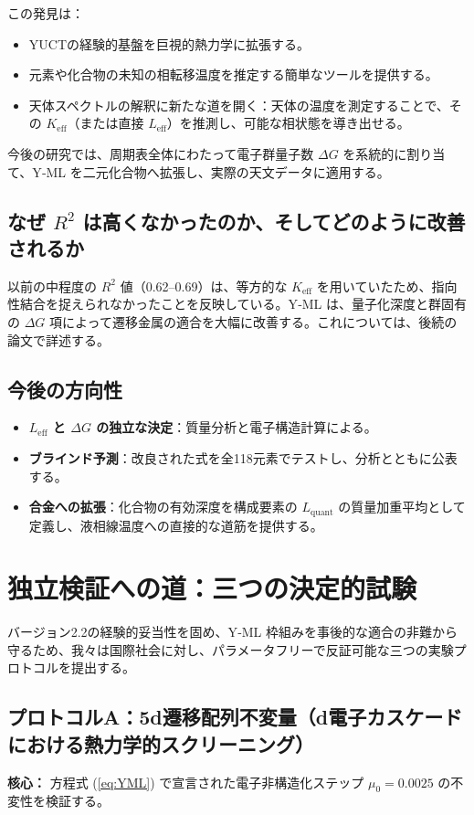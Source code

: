 \documentclass[11pt,a4paper]{article}
\newcommand{\Keff}{K_{\mathrm{eff}}}
\begin{document}
	この発見は：
	\begin{itemize}
		\item YUCTの経験的基盤を巨視的熱力学に拡張する。
		\item 元素や化合物の未知の相転移温度を推定する簡単なツールを提供する。
		\item 天体スペクトルの解釈に新たな道を開く：天体の温度を測定することで、その \(\Keff\)（または直接 \(L_{\mathrm{eff}}\)）を推測し、可能な相状態を導き出せる。
	\end{itemize}
	今後の研究では、周期表全体にわたって電子群量子数 \(\Delta G\) を系統的に割り当て、Y‑ML を二元化合物へ拡張し、実際の天文データに適用する。
	
	\subsection{なぜ \(R^2\) は高くなかったのか、そしてどのように改善されるか}
	以前の中程度の \(R^2\) 値（0.62–0.69）は、等方的な \(K_{\mathrm{eff}}\) を用いていたため、指向性結合を捉えられなかったことを反映している。Y‑ML は、量子化深度と群固有の \(\Delta G\) 項によって遷移金属の適合を大幅に改善する。これについては、後続の論文で詳述する。
	
	\subsection{今後の方向性}
	\begin{itemize}
		\item \textbf{\(L_{\mathrm{eff}}\) と \(\Delta G\) の独立な決定}：質量分析と電子構造計算による。
		\item \textbf{ブラインド予測}：改良された式を全118元素でテストし、分析とともに公表する。
		\item \textbf{合金への拡張}：化合物の有効深度を構成要素の \(L_{\mathrm{quant}}\) の質量加重平均として定義し、液相線温度への直接的な道筋を提供する。
	\end{itemize}
	
	\section{独立検証への道：三つの決定的試験}
	\label{sec:decisive_tests}
	
	バージョン2.2の経験的妥当性を固め、Y‑ML 枠組みを事後的な適合の非難から守るため、我々は国際社会に対し、パラメータフリーで反証可能な三つの実験プロトコルを提出する。
	
	\subsection{プロトコルA：5d遷移配列不変量（d電子カスケードにおける熱力学的スクリーニング）}
	\textbf{核心：} 方程式 (\ref{eq:YML}) で宣言された電子非構造化ステップ \(\mu_0 = 0.0025\) の不変性を検証する。
	
\end{document}
